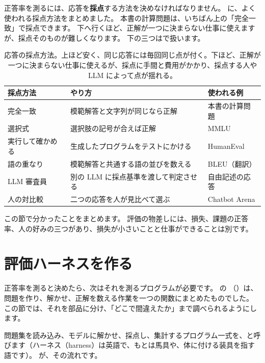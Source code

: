 正答率を測るには、応答を\textbf{採点}する方法を決めなければなりません。
に、よく使われる採点方法をまとめました。
本書の計算問題は、いちばん上の「完全一致」で採点できます。
下へ行くほど、正解が一つに決まらない仕事に使えますが、採点そのものが難しくなります。
下の三つはで扱います。

\begin{table}[tbp]
\centering
\caption{応答の採点方法。上ほど安く、同じ応答には毎回同じ点が付く。下ほど、正解が一つに決まらない仕事に使えるが、採点に手間と費用がかかり、採点する人や LLM によって点が揺れる。}
\label{tab:es-scoring}
\small
\begin{tabularx}{\linewidth}{lXl}
\toprule
採点方法 & やり方 & 使われる例 \\
\midrule
完全一致 & 模範解答と文字列が同じなら正解 & 本書の計算問題 \\
選択式 & 選択肢の記号が合えば正解 & MMLU\cite{hendrycks2021measuring} \\
実行して確かめる & 生成したプログラムをテストにかける & HumanEval\cite{chen2021evaluating} \\
語の重なり & 模範解答と共通する語の並びを数える & BLEU\cite{papineni2002bleu}（翻訳） \\
LLM 審査員 & 別の LLM に採点基準を渡して判定させる & 自由記述の応答 \\
人の対比較 & 二つの応答を人が見比べて選ぶ & Chatbot Arena\cite{chiang2024chatbot} \\
\bottomrule
\end{tabularx}
\end{table}

この節で分かったことをまとめます。
評価の物差しには、損失、課題の正答率、人の好みの三つがあり、損失が小さいことと仕事ができることは別です。

\section{評価ハーネスを作る}\label{sec:es-harness}

正答率を測ると決めたら、次はそれを測るプログラムが必要です。
の （）は、問題を作り、解かせ、正解を数える作業を一つの関数にまとめたものでした。
この節では、それを部品に分け、「どこで間違えたか」まで調べられるようにします。

問題集を読み込み、モデルに解かせ、採点し、集計するプログラム一式を、と呼びます（ハーネス（harness）は英語で、もとは馬具や、体に付ける装具を指す語です）。
が、その流れです。

